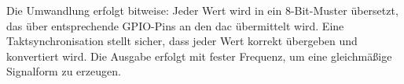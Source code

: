 Die Umwandlung erfolgt bitweise: Jeder Wert wird in ein 8-Bit-Muster übersetzt, das über entsprechende GPIO-Pins an den \gls{dac} übermittelt wird. Eine Taktsynchronisation stellt sicher, dass jeder Wert korrekt übergeben und konvertiert wird. Die Ausgabe erfolgt mit fester Frequenz, um eine gleichmäßige Signalform zu erzeugen.
